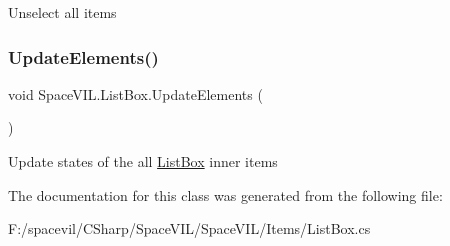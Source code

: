 Unselect all items 

\mbox{\label{class_space_v_i_l_1_1_list_box_aeef6380f4eff45ac43737fbc42dcf2e1}} 
\subsubsection{\texorpdfstring{Update\+Elements()}{UpdateElements()}}
{\footnotesize\ttfamily void Space\+V\+I\+L.\+List\+Box.\+Update\+Elements (\begin{DoxyParamCaption}{ }\end{DoxyParamCaption})}



Update states of the all \mbox{\hyperlink{class_space_v_i_l_1_1_list_box}{List\+Box}} inner items 



The documentation for this class was generated from the following file\+:\begin{DoxyCompactItemize}
\item 
F\+:/spacevil/\+C\+Sharp/\+Space\+V\+I\+L/\+Space\+V\+I\+L/\+Items/List\+Box.\+cs\end{DoxyCompactItemize}
